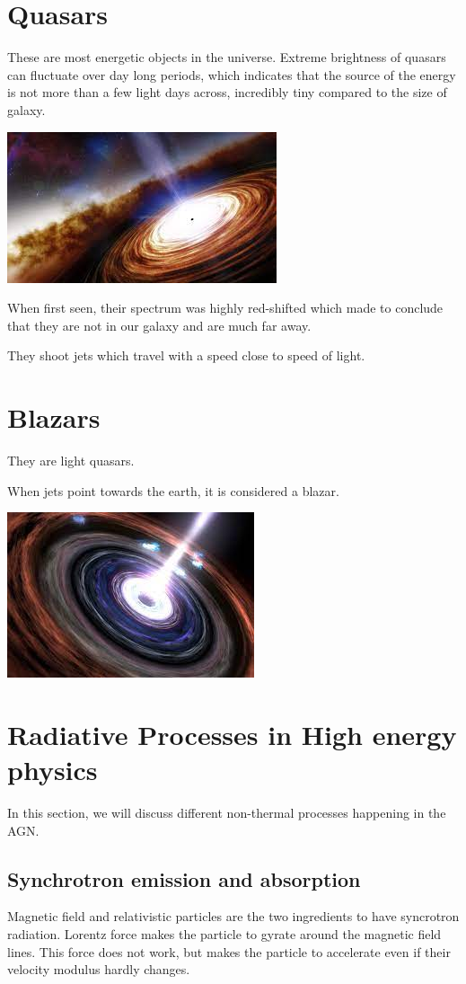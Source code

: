 \documentclass{book}
\begin{document}
\section{Quasars}
These are most energetic objects in the universe.
Extreme brightness of quasars can fluctuate over day long periods, which indicates that the source of the energy is not more than a few light days across, incredibly tiny compared to the size of galaxy.


\includegraphics{quasar.jpeg}


When first seen, their spectrum was highly red-shifted which made to conclude that they are not in our galaxy and are much far away.

They shoot jets which travel with a speed close to speed of light.


\section{Blazars}
They are light quasars.

When jets point towards the earth, it is considered a blazar.


\includegraphics{blazar.jpeg}

\section{Radiative Processes in High energy physics}
In this section, we will discuss different non-thermal processes happening in the AGN.

\subsection{Synchrotron emission and absorption}
Magnetic field and relativistic particles are the two ingredients to have syncrotron radiation. Lorentz force makes the particle to gyrate around the magnetic field lines. This force does not work, but makes the particle to accelerate even if their velocity modulus hardly changes.
\end{document}
